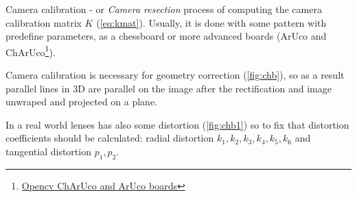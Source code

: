 Camera calibration - or \textit{Camera resection} process of computing the camera calibration matrix $K$ (\autoref{eq:kmat}).
Usually, it is done with some pattern with predefine parameters, as a chessboard or more advanced boards (ArUco and ChArUco\footnote{\href{https://docs.opencv.org/4.x/df/d4a/tutorial_charuco_detection.html}{Opencv ChArUco and ArUco boards}}).

Camera calibration is necessary for geometry correction (\autoref{fig:chb}), so as a result parallel lines in 3D are parallel on the image after the rectification and image unwraped and projected on a plane.

In a real world lenses has also some distortion (\autoref{fig:chb1}) so to fix that distortion coefficients should be calculated: radial distortion $k_1, k_2, k_3, k_4, k_5, k_6$ and tangential distortion $p_1, p_2$.

